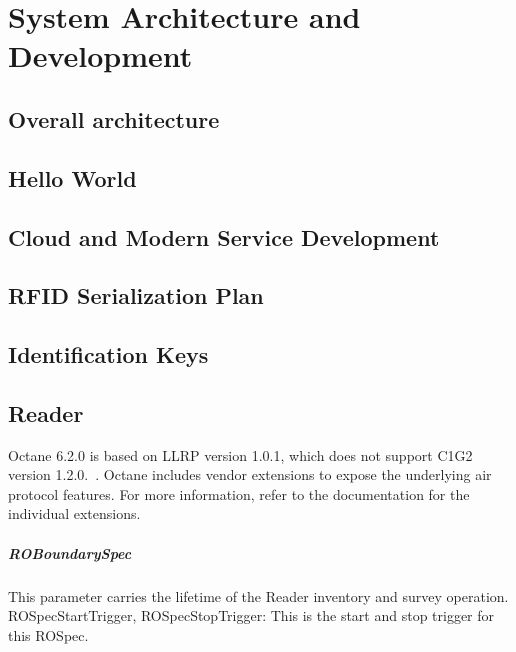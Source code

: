 \chapter{System Architecture and Development}

\section{Overall architecture}

\section{Hello World}

\section{Cloud and Modern Service Development}

\section{RFID Serialization Plan}

\section{Identification Keys}

\section{Reader}

Octane 6.2.0 is based on LLRP version 1.0.1, which does not support C1G2 version 1.2.0.~\cite[sec. 3.1.21]{ImpinjOctaneLLRP}. Octane includes vendor extensions to expose the underlying air protocol features. For more information, refer to the documentation for the individual extensions.

\paragraph{ROBoundarySpec}

This parameter carries the lifetime of the Reader inventory and survey operation.
ROSpecStartTrigger, ROSpecStopTrigger: This is the start and stop trigger for this ROSpec.

